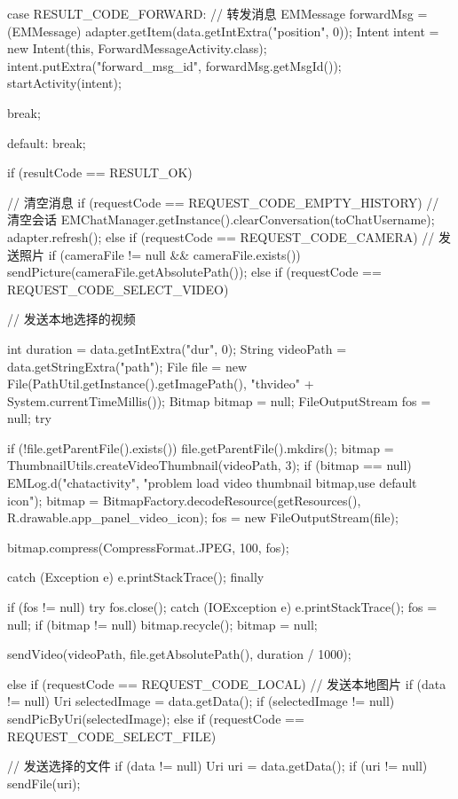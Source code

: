 {{{{			case RESULT_CODE_FORWARD: // 转发消息
				EMMessage forwardMsg = (EMMessage) adapter.getItem(data.getIntExtra("position", 0));
				Intent intent = new Intent(this, ForwardMessageActivity.class);
				intent.putExtra("forward_msg_id", forwardMsg.getMsgId());
				startActivity(intent);
				
				break;

			default:
				break;
			}
		}
		if (resultCode == RESULT_OK) { // 清空消息
			if (requestCode == REQUEST_CODE_EMPTY_HISTORY) {
				// 清空会话
				EMChatManager.getInstance().clearConversation(toChatUsername);
				adapter.refresh();
			} else if (requestCode == REQUEST_CODE_CAMERA) { // 发送照片
				if (cameraFile != null && cameraFile.exists())
					sendPicture(cameraFile.getAbsolutePath());
			} else if (requestCode == REQUEST_CODE_SELECT_VIDEO) { // 发送本地选择的视频

				int duration = data.getIntExtra("dur", 0);
				String videoPath = data.getStringExtra("path");
				File file = new File(PathUtil.getInstance().getImagePath(), "thvideo" + System.currentTimeMillis());
				Bitmap bitmap = null;
				FileOutputStream fos = null;
				try {
					if (!file.getParentFile().exists()) {
						file.getParentFile().mkdirs();
					}
					bitmap = ThumbnailUtils.createVideoThumbnail(videoPath, 3);
					if (bitmap == null) {
						EMLog.d("chatactivity", "problem load video thumbnail bitmap,use default icon");
						bitmap = BitmapFactory.decodeResource(getResources(), R.drawable.app_panel_video_icon);
					}
					fos = new FileOutputStream(file);

					bitmap.compress(CompressFormat.JPEG, 100, fos);

				} catch (Exception e) {
					e.printStackTrace();
				} finally {
					if (fos != null) {
						try {
							fos.close();
						} catch (IOException e) {
							e.printStackTrace();
						}
						fos = null;
					}
					if (bitmap != null) {
						bitmap.recycle();
						bitmap = null;
					}

				}
				sendVideo(videoPath, file.getAbsolutePath(), duration / 1000);

			} else if (requestCode == REQUEST_CODE_LOCAL) { // 发送本地图片
				if (data != null) {
					Uri selectedImage = data.getData();
					if (selectedImage != null) {
						sendPicByUri(selectedImage);
					}
				}
			} else if (requestCode == REQUEST_CODE_SELECT_FILE) { // 发送选择的文件
				if (data != null) {
					Uri uri = data.getData();
					if (uri != null) {
						sendFile(uri);
					}
				}

}}}}
